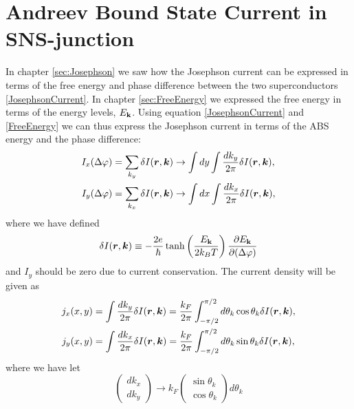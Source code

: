 \chapter{Andreev Bound State Current in SNS-junction}
\label{sec:current}
In chapter \ref{sec:Josephson} we saw how the Josephson current can be expressed in terms of the free energy and phase difference between the two superconductors \eqref{JosephsonCurrent}. In chapter \ref{sec:FreeEnergy} we expressed the free energy in terms of the energy levels, $E_{\mathbf{k}}$. Using equation \eqref{JosephsonCurrent} and \eqref{FreeEnergy} we can thus express the Josephson current in terms of the ABS energy and the phase difference:
\begin{equation}
\begin{split}
    I_x(\Delta \varphi) &= \sum_{k_y} \delta I(\boldsymbol{r},\boldsymbol{k}) \rightarrow \int dy \int \frac{dk_y}{2\pi} \delta I(\boldsymbol{r},\boldsymbol{k}),\\
    I_y(\Delta \varphi) &= \sum_{k_x} \delta I(\boldsymbol{r},\boldsymbol{k}) \rightarrow \int dx \int \frac{dk_x}{2\pi} \delta I(\boldsymbol{r},\boldsymbol{k}),\\
\end{split}
\label{TotalCurrent}
\end{equation}
where we have defined 
\begin{equation}
    \delta I(\boldsymbol{r},\boldsymbol{k}) \equiv -\frac{2e}{\hbar}\tanh\left(\frac{E_{\mathbf{k}}}{2k_BT}\right)\frac{\partial E_{\mathbf{k}}}{\partial (\Delta \varphi)}
\label{Current5}
\end{equation}
and $I_y$ should be zero due to current conservation. The current density will be given as
\begin{equation}
\begin{split}
    j_x(x,y) &= \int \frac{dk_y}{2\pi} \delta I(\boldsymbol{r},\boldsymbol{k}) = \frac{k_F}{2\pi}\int_{-\pi/2}^{\pi/2} d\theta_k \cos\theta_k \delta I(\boldsymbol{r},\boldsymbol{k}) ,\\
    j_y(x,y) &= \int \frac{dk_x}{2\pi} \delta I(\boldsymbol{r},\boldsymbol{k}) = \frac{k_F}{2\pi}\int_{-\pi/2}^{\pi/2} d\theta_k \sin\theta_k \delta I(\boldsymbol{r},\boldsymbol{k}),
\end{split}
\label{CurrentDensity}
\end{equation}
where we have let 
\begin{equation}
\begin{pmatrix}dk_x\\dk_y\end{pmatrix} \rightarrow k_F\begin{pmatrix}\sin\theta_k\\ \cos\theta_k\end{pmatrix}d\theta_k
\end{equation}
